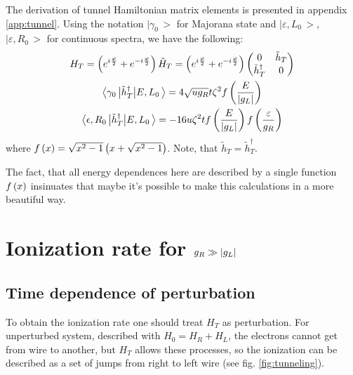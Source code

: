 The derivation of tunnel Hamiltonian matrix elements is presented in appendix \ref{app:tunnel}. Using the notation  $ \big|\gamma_{0}\,\big> $ for Majorana state and $ \big|\varepsilon,L_{0}\,\big> $, $ \big|\varepsilon,R_{0}\,\big> $ for continuous spectra, we have the following:
\begin{gather}
H_T=
\left(e^{i\frac{\varphi}{2}}+e^{-i\frac{\varphi}{2}}\right)
\tilde{H}_{T}
=
\left(e^{i\frac{\varphi}{2}}+e^{-i\frac{\varphi}{2}}\right)
\begin{pmatrix}
0 & \tilde{h}_{T} \\
\tilde{h}_T^\dagger & 0
\end{pmatrix}
\\
\label{tunnel_matrix_elements_maj-cont}
	\big<\gamma_{0}\,\big|\tilde{h}_{T}^{\dagger}\big|E,L_{0}\,\big>
	=
	4\sqrt{ug_{R}}
	t\zeta^{2}
	f\left(\frac{E}{\left|g_L\right|}\right)
	\\
	\label{tunnel_matrix_elements_cont-cont}
	\big<\epsilon,R_{0}\,\big|\tilde{h}_{T}^{\dagger}\big|E,L_{0}\,\big>
	=
	-16u\zeta^{2}t
	f\left(\frac{E}{\left|g_L\right|}\right)
	f\left(\frac{\varepsilon}{g_R}\right)
\end{gather}
where $ f\left(x\right)=\sqrt{x^2-1}\left(x+\sqrt{x^2-1}\right) $. Note, that $ \tilde{h}_{T} =\tilde{h}_{T}^\dagger $.

 The fact, that all energy dependences here are described by a single function $ f\left(x\right) $ insinuates that maybe it's possible to make this calculations in a more beautiful way.

\section{Ionization rate for $ g_R\gg\left|g_L\right| $}


\subsection{Time dependence of perturbation}

To obtain the ionization rate one should treat $ H_T $ as perturbation. For unperturbed system, described with $ H_0=H_R+H_L $, the electrons cannot get from wire to another, but $ H_T $ allows these processes, so the ionization can be described as a set of jumps from right to left wire (see fig. \ref{fig:tunneling}).

